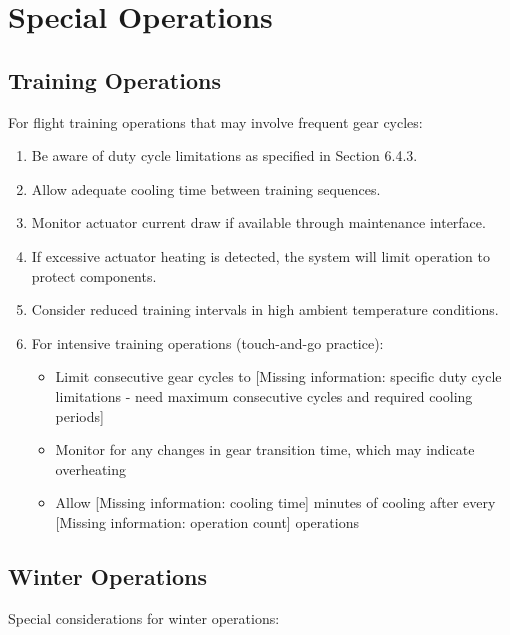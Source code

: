 \documentclass[12pt,a4paper,twoside,openright]{book}
\begin{document}
\section{Special Operations}

\subsection{Training Operations}

For flight training operations that may involve frequent gear cycles:

\begin{enumerate}
    \item Be aware of duty cycle limitations as specified in Section 6.4.3.
    \item Allow adequate cooling time between training sequences.
    \item Monitor actuator current draw if available through maintenance interface.
    \item If excessive actuator heating is detected, the system will limit operation to protect components.
    \item Consider reduced training intervals in high ambient temperature conditions.
    \item For intensive training operations (touch-and-go practice):
\begin{itemize}
        \item Limit consecutive gear cycles to {\color{red}[Missing information: specific duty cycle limitations - need maximum consecutive cycles and required cooling periods]}
        \item Monitor for any changes in gear transition time, which may indicate overheating
        \item Allow {\color{red}[Missing information: cooling time]} minutes of cooling after every {\color{red}[Missing information: operation count]} operations
\end{itemize}
\end{enumerate}

\subsection{Winter Operations}

Special considerations for winter operations:
\end{document}
